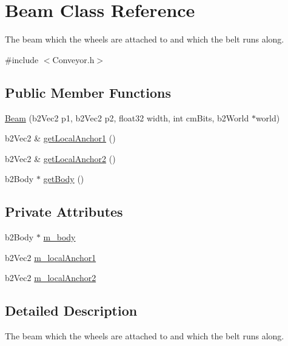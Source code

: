 \hypertarget{classBeam}{\section{Beam Class Reference}
\label{classBeam}
}


The beam which the wheels are attached to and which the belt runs along.  




{\ttfamily \#include $<$Conveyor.\-h$>$}

\subsection*{Public Member Functions}
\begin{DoxyCompactItemize}
\item 
\hyperlink{classBeam_a85ec52f2a4eb46b6306b3d3351be4111}{Beam} (b2\-Vec2 p1, b2\-Vec2 p2, float32 width, int cm\-Bits, b2\-World $\ast$world)
\item 
b2\-Vec2 \& \hyperlink{classBeam_a4c0de52fcd115dd4e3267ba99668a45b}{get\-Local\-Anchor1} ()
\item 
b2\-Vec2 \& \hyperlink{classBeam_af96f32192c1729ba2ba6f8762f6d714a}{get\-Local\-Anchor2} ()
\item 
b2\-Body $\ast$ \hyperlink{classBeam_acdfad0d43f2aaf67e4238129c7e4215d}{get\-Body} ()
\end{DoxyCompactItemize}
\subsection*{Private Attributes}
\begin{DoxyCompactItemize}
\item 
b2\-Body $\ast$ \hyperlink{classBeam_a282db593ede22f681dbf57729fd203b0}{m\-\_\-body}
\item 
b2\-Vec2 \hyperlink{classBeam_a4155af3bd2f382a56d5cbf275b626a22}{m\-\_\-local\-Anchor1}
\item 
b2\-Vec2 \hyperlink{classBeam_a00a74039f9b2feb4e440200cca2046b2}{m\-\_\-local\-Anchor2}
\end{DoxyCompactItemize}


\subsection{Detailed Description}
The beam which the wheels are attached to and which the belt runs along. 

